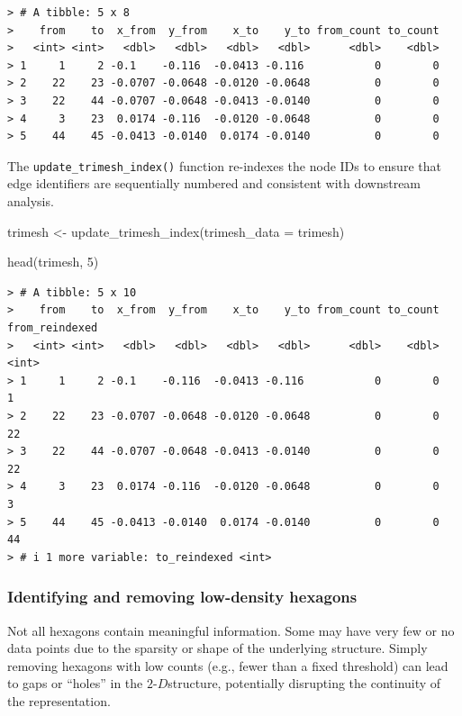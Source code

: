 \documentclass[
  11pt,
  a4paper,
]{report}
\newenvironment{Shaded}{\begin{snugshade}}{\end{snugshade}}
\newcommand{\AttributeTok}[1]{\textcolor[rgb]{0.40,0.45,0.13}{#1}}
\newcommand{\DecValTok}[1]{\textcolor[rgb]{0.68,0.00,0.00}{#1}}
\newcommand{\FunctionTok}[1]{\textcolor[rgb]{0.28,0.35,0.67}{#1}}
\newcommand{\NormalTok}[1]{\textcolor[rgb]{0.00,0.23,0.31}{#1}}
\newcommand{\OtherTok}[1]{\textcolor[rgb]{0.00,0.23,0.31}{#1}}
\newcommand{\twoD}{$2\text{-}D$}
\begin{document}
\begin{verbatim}
> # A tibble: 5 x 8
>    from    to  x_from  y_from    x_to    y_to from_count to_count
>   <int> <int>   <dbl>   <dbl>   <dbl>   <dbl>      <dbl>    <dbl>
> 1     1     2 -0.1    -0.116  -0.0413 -0.116           0        0
> 2    22    23 -0.0707 -0.0648 -0.0120 -0.0648          0        0
> 3    22    44 -0.0707 -0.0648 -0.0413 -0.0140          0        0
> 4     3    23  0.0174 -0.116  -0.0120 -0.0648          0        0
> 5    44    45 -0.0413 -0.0140  0.0174 -0.0140          0        0
\end{verbatim}

The \texttt{update\_trimesh\_index()} function re-indexes the node IDs
to ensure that edge identifiers are sequentially numbered and consistent
with downstream analysis.

\begin{Shaded}
\begin{Highlighting}[]
\NormalTok{trimesh }\OtherTok{\textless{}{-}} \FunctionTok{update\_trimesh\_index}\NormalTok{(}\AttributeTok{trimesh\_data =}\NormalTok{ trimesh)}

\FunctionTok{head}\NormalTok{(trimesh, }\DecValTok{5}\NormalTok{)}
\end{Highlighting}
\end{Shaded}

\begin{verbatim}
> # A tibble: 5 x 10
>    from    to  x_from  y_from    x_to    y_to from_count to_count from_reindexed
>   <int> <int>   <dbl>   <dbl>   <dbl>   <dbl>      <dbl>    <dbl>          <int>
> 1     1     2 -0.1    -0.116  -0.0413 -0.116           0        0              1
> 2    22    23 -0.0707 -0.0648 -0.0120 -0.0648          0        0             22
> 3    22    44 -0.0707 -0.0648 -0.0413 -0.0140          0        0             22
> 4     3    23  0.0174 -0.116  -0.0120 -0.0648          0        0              3
> 5    44    45 -0.0413 -0.0140  0.0174 -0.0140          0        0             44
> # i 1 more variable: to_reindexed <int>
\end{verbatim}

\subsubsection{Identifying and removing low-density
hexagons}\label{identifying-and-removing-low-density-hexagons}

Not all hexagons contain meaningful information. Some may have very few
or no data points due to the sparsity or shape of the underlying
structure. Simply removing hexagons with low counts (e.g., fewer than a
fixed threshold) can lead to gaps or ``holes'' in the \twoD structure,
potentially disrupting the continuity of the representation.
\end{document}

